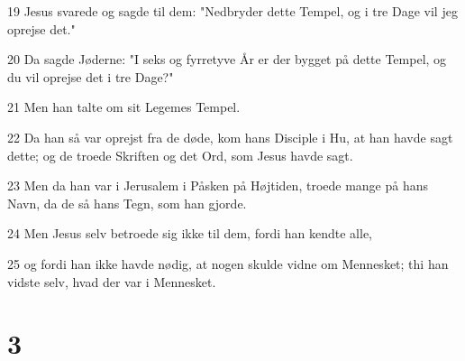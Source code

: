 \par 19 Jesus svarede og sagde til dem: "Nedbryder dette Tempel, og i tre Dage vil jeg oprejse det."
\par 20 Da sagde Jøderne: "I seks og fyrretyve År er der bygget på dette Tempel, og du vil oprejse det i tre Dage?"
\par 21 Men han talte om sit Legemes Tempel.
\par 22 Da han så var oprejst fra de døde, kom hans Disciple i Hu, at han havde sagt dette; og de troede Skriften og det Ord, som Jesus havde sagt.
\par 23 Men da han var i Jerusalem i Påsken på Højtiden, troede mange på hans Navn, da de så hans Tegn, som han gjorde.
\par 24 Men Jesus selv betroede sig ikke til dem, fordi han kendte alle,
\par 25 og fordi han ikke havde nødig, at nogen skulde vidne om Mennesket; thi han vidste selv, hvad der var i Mennesket.

\chapter{3}

